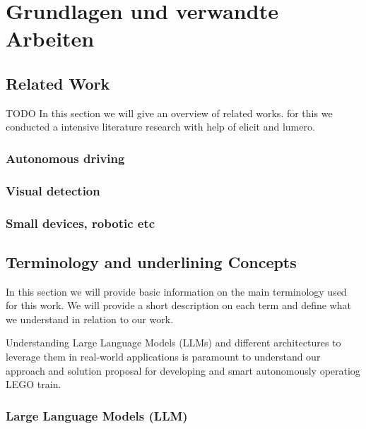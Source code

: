 \chapter{Grundlagen und verwandte Arbeiten}
\label{ch:background}


%
%
\section{Related Work}
\label{sec:background:first_section}{TODO} 
In this section we will give an overview of related works. for this we conducted a intensive literature research with help of elicit and lumero. 



\subsection{Autonomous driving}
\label{subsec:background:first_section:first_subsection}


\subsection{Visual detection}
\label{subsec:background:first_section:second_subsection}


\subsection{Small devices, robotic etc}
\label{subsec:background:first_section:third_subsection}


%
%
\section{Terminology and underlining Concepts}
\label{sec:background:second_section}
In this section we will provide basic information on the main terminology used for this work. We will provide a short description on each term and define what we understand in relation to our work.

Understanding Large Language Models (LLMs) and different architectures to leverage them in real-world applications is paramount to understand our approach and solution proposal for developing and smart autonomously operatiog LEGO train.

\subsection{Large Language Models (LLM)}
\label{subsec:background:second_section:first_subsection}

